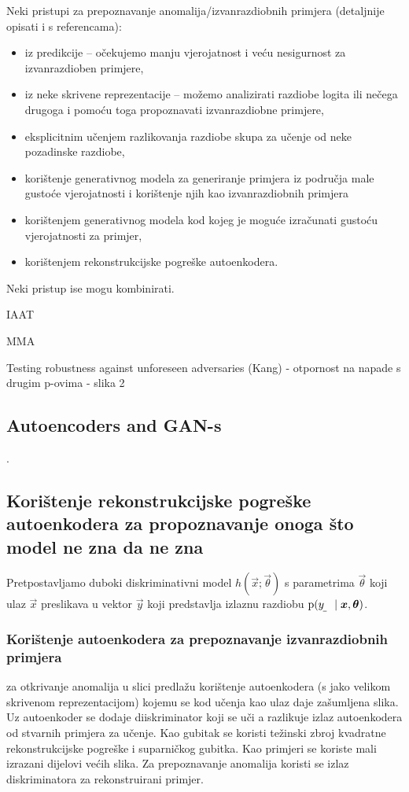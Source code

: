 \documentclass[oneside]{book}
\begin{document}
Neki pristupi za prepoznavanje anomalija/izvanrazdiobnih primjera (detaljnije opisati i s referencama):
\begin{itemize}
    \item iz predikcije -- očekujemo manju vjerojatnost i veću nesigurnost za izvanrazdioben primjere,
    \item iz neke skrivene reprezentacije -- možemo analizirati razdiobe logita ili nečega drugoga i pomoću toga propoznavati izvanrazdiobne primjere,
    \item eksplicitnim učenjem razlikovanja razdiobe skupa za učenje od neke pozadinske razdiobe,
    \item korištenje generativnog modela za generiranje primjera iz područja male gustoće vjerojatnosti i korištenje njih kao izvanrazdiobnih primjera
    \item korištenjem generativnog modela kod kojeg je moguće izračunati gustoću vjerojatnosti za primjer,
    \item korištenjem rekonstrukcijske pogreške autoenkodera.
\end{itemize}
Neki pristup ise mogu kombinirati.

IAAT

MMA

Testing robustness against unforeseen adversaries (Kang) - otpornost na napade s drugim p-ovima - slika 2

\subsection{Autoencoders and GAN-s}

.


\subsection{Korištenje rekonstrukcijske pogreške autoenkodera za propoznavanje onoga što model ne zna da ne zna}

Pretpostavljamo duboki diskriminativni model $h(\vec x;\vec\theta)$ s parametrima $\vec\theta$ koji ulaz $\vec x$ preslikava u vektor $\vec y$ koji predstavlja izlaznu razdiobu  $\p(\rvar y\mid \vec x, \vec\theta)$.

\subsubsection{Korištenje autoenkodera za prepoznavanje izvanrazdiobnih primjera}

\citet{Sabokrou:2018:ALOCCND} za otkrivanje anomalija u slici predlažu korištenje autoenkodera (s jako velikom skrivenom reprezentacijom) kojemu se kod učenja kao ulaz daje zašumljena slika. Uz autoenkoder se dodaje diiskriminator koji se uči a razlikuje izlaz autoenkodera od stvarnih primjera za učenje. Kao gubitak se koristi težinski zbroj kvadratne rekonstrukcijske pogreške i suparničkog gubitka. Kao primjeri se koriste mali izrazani dijelovi većih slika. Za prepoznavanje anomalija koristi se izlaz diskriminatora za rekonstruirani primjer.
\end{document}
